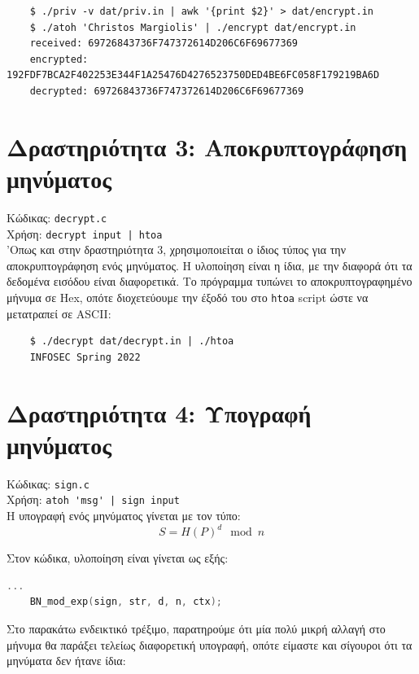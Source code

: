 \documentclass[12pt]{article}
\begin{document}
\begin{lstlisting}
	$ ./priv -v dat/priv.in | awk '{print $2}' > dat/encrypt.in
	$ ./atoh 'Christos Margiolis' | ./encrypt dat/encrypt.in
	received: 69726843736F747372614D206C6F69677369
	encrypted: 192FDF7BCA2F402253E344F1A25476D4276523750DED4BE6FC058F179219BA6D
	decrypted: 69726843736F747372614D206C6F69677369
\end{lstlisting}

\section{Δραστηριότητα 3: Αποκρυπτογράφηση μηνύματος}

Κώδικας: \lstinline{decrypt.c} \\
Χρήση: \lstinline{decrypt input | htoa} \\

'Οπως και στην δραστηριότητα 3, χρησιμοποιείται ο ίδιος τύπος για την
αποκρυπτογράφηση ενός μηνύματος. Η υλοποίηση είναι η ίδια, με την διαφορά ότι
τα δεδομένα εισόδου είναι διαφορετικά. Το πρόγραμμα τυπώνει το
αποκρυπτογραφημένο μήνυμα σε Hex, οπότε διοχετεύουμε την έξοδό του στο
\lstinline{htoa} script ώστε να μετατραπεί σε ASCII: \\

\begin{lstlisting}
	$ ./decrypt dat/decrypt.in | ./htoa
	INFOSEC Spring 2022
\end{lstlisting}

\section{Δραστηριότητα 4: Υπογραφή μηνύματος}

Κώδικας: \lstinline{sign.c} \\
Χρήση: \lstinline{atoh 'msg' | sign input} \\

Η υπογραφή ενός μηνύματος γίνεται με τον τύπο:
\[S = H(P)^d \mod n\]

Στον κώδικα, υλοποίηση είναι γίνεται ως εξής: \\
\begin{lstlisting}[language=C]
	...
	BN_mod_exp(sign, str, d, n, ctx);
\end{lstlisting}

Στο παρακάτω ενδεικτικό τρέξιμο, παρατηρούμε ότι μία πολύ μικρή αλλαγή στο
μήνυμα θα παράξει τελείως διαφορετική υπογραφή, οπότε είμαστε και σίγουροι ότι
τα μηνύματα δεν ήτανε ίδια: \\
\end{document}
